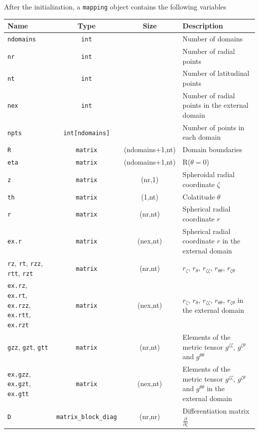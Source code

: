 After the initialization, a \verb|mapping| object contains the following variables

\medskip

\renewcommand{\arraystretch}{1.3} 

\noindent\begin{longtable}{p{3.7cm}ccp{5cm}}
Name&Type&Size&Description\\
\hline
\texttt{ndomains}&\texttt{int}&&Number of domains\\
\texttt{nr}&\texttt{int}&&Number of radial points\\
\texttt{nt}&\texttt{int}&&Number of latitudinal points\\
\texttt{nex}&\texttt{int}&&Number of radial points in the external domain\\
\texttt{npts}&\texttt{int[ndomains]}&&Number of points in each domain\\
\texttt{R}&\texttt{matrix}&(ndomains+1,nt)&Domain boundaries\\
\texttt{eta}&\texttt{matrix}&(ndomains+1,nt)&R($\theta=0$)\\
\texttt{z}&\texttt{matrix}&(nr,1)& Spheroidal radial coordinate $\zeta$\\
\texttt{th}&\texttt{matrix}&(1,nt)& Colatitude $\theta$\\
\texttt{r}&\texttt{matrix}&(nr,nt)& Spherical radial coordinate $r$\\
\texttt{ex.r}&\texttt{matrix}&(nex,nt)& Spherical radial coordinate $r$ in
the external domain\\
\texttt{rz}, \texttt{rt}, \texttt{rzz}, \texttt{rtt}, \texttt{rzt}
&\texttt{matrix}&(nr,nt)
& $r_\zeta$, $r_\theta$, $r_{\zeta\zeta}$, $r_{\theta\theta}$, $r_{\zeta\theta}$\\
\texttt{ex.rz}, \texttt{ex.rt}, \texttt{ex.rzz}, \texttt{ex.rtt}, \texttt{ex.rzt}
&\texttt{matrix}&(nex,nt)
& $r_\zeta$, $r_\theta$, $r_{\zeta\zeta}$, $r_{\theta\theta}$, $r_{\zeta\theta}$
in the external domain\\
\texttt{gzz}, \texttt{gzt}, \texttt{gtt}&\texttt{matrix}&(nr,nt)&
Elements of the metric tensor $g^{\zeta\zeta}$, $g^{\zeta\theta}$ and $g^{\theta\theta}$ \\
\texttt{ex.gzz}, \texttt{ex.gzt}, \texttt{ex.gtt}&\texttt{matrix}&(nex,nt)&
Elements of the metric tensor $g^{\zeta\zeta}$, $g^{\zeta\theta}$ and $g^{\theta\theta}$ 
in the external domain\\
\texttt{D}&\texttt{matrix\_block\_diag}&(nr,nr)& Differentiation matrix $\frac{\partial}{\partial\zeta}$\\

\end{longtable}
